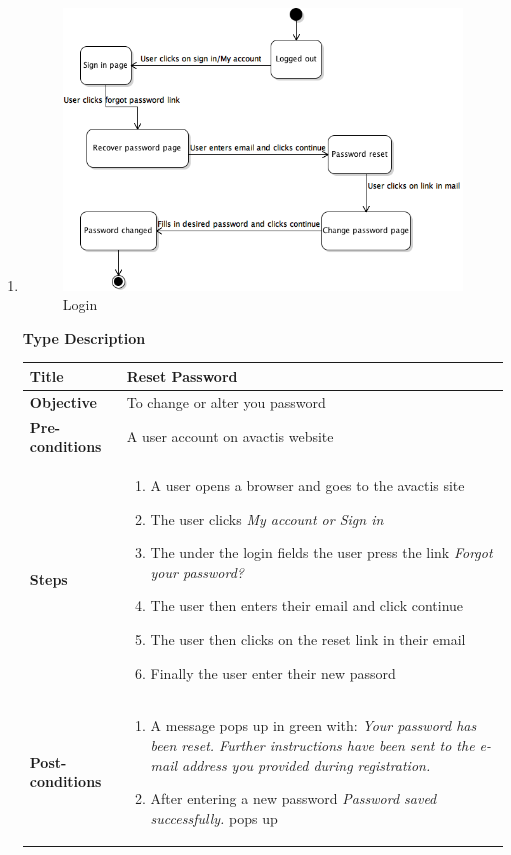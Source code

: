 \documentclass[UKenglish,12pt]{article}
\begin{document}
\begin{enumerate}
\item
\begin{figure}[!h]
\centering
\includegraphics[scale=0.7,keepaspectratio]{Images/ResetPassword.png}
\caption{Login}
\end{figure}
\newpage
\textbf{\hspace{0.3cm}Type\hspace{4.4cm} Description}
\newline \vspace{0.2cm}
\begin{tabular}{| p{5cm} | p{10cm} | }
	\hline
	 \textbf{Title} & Reset Password\\ \hline
	 \textbf{Objective} & To change or alter you password\\ \hline
	 \textbf{Pre-conditions} & A user account on avactis website\\ \hline
	 \textbf{Steps} & \begin{enumerate} \item A user opens a browser and goes to the avactis site \item The user clicks \textit{My account or Sign in} \item The under the login fields the user press the link \textit{Forgot your password?} \item The user then enters their email and click continue \item The user then clicks on the reset link in their email \item Finally the user enter their new passord \end{enumerate} \\ \hline
	 \textbf{Post-conditions} & \begin{enumerate} \item A message pops up in green with: \textit{Your password has been reset. Further instructions have been sent to the e-mail address you provided during registration.} \item After entering a new password \textit{Password saved successfully.} pops up \end{enumerate}\\ \hline

\end{tabular}
\end{enumerate}
\end{document}
